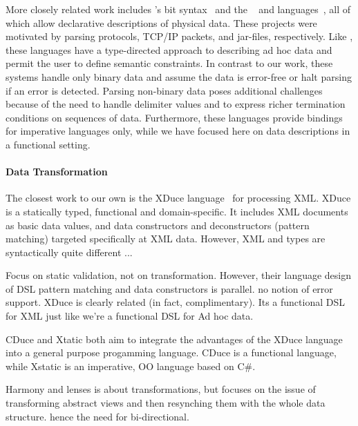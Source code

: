 More closely related work includes \erlang{}'s bit
syntax~\cite{erlang} and the \packettypes{}~\cite{sigcomm00} and
\datascript{} languages~\cite{gpce02}, all of which allow declarative
descriptions of physical data.  These projects were motivated by
parsing protocols, \textsc{TCP/IP} packets, and \java{} jar-files,
respectively.  Like \datatype{}, these languages have a type-directed
approach to describing ad hoc data and permit the user to define
semantic constraints.  In contrast to our work, these systems handle
only binary data and assume the data is error-free or halt parsing if
an error is detected.  Parsing non-binary data poses additional
challenges because of the need to handle delimiter values and to
express richer termination conditions on sequences of
data. Furthermore, these languages provide bindings for imperative
languages only, while we have focused here on data descriptions in a
functional setting.


\paragraph{Data Transformation}

The closest work to our own is the XDuce
language~\cite{hosoya+:xduce-journal} for processing {XML}. XDuce is a
statically typed, functional and domain-specific. It includes {XML}
documents as basic data values, and data constructors and
deconstructors (pattern matching) targeted specifically at {XML}
data. However, {XML} and \datatype{} types are syntactically quite
different ...
 
Focus on static validation, not on transformation. However, their
language design of DSL pattern matching and data constructors is
parallel. no notion of error support.  XDuce is clearly related (in
fact, complimentary). Its a functional DSL for XML just like we're a
functional DSL for Ad hoc data.

CDuce and Xtatic both aim to integrate the advantages of the XDuce
language into a general purpose progamming language. CDuce is a
functional language, while Xstatic is an imperative, OO language based
on C\#.

Harmony and lenses is about transformations, but focuses on the issue
of transforming abstract views and then resynching them with the whole
data structure. hence the need for bi-directional.


